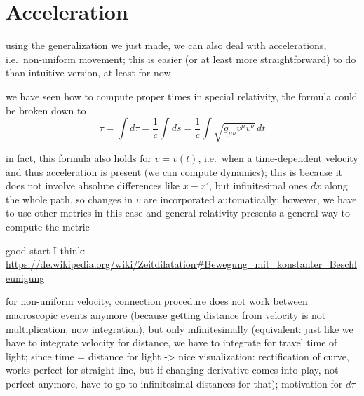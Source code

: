 \newpage



	\section{Acceleration}%
using the generalization we just made, we can also deal with accelerations, i.e.~non-uniform movement; this is easier (or at least more straightforward) to do than intuitive version, at least for now


we have seen how to compute proper times in special relativity, the formula could be broken down to 
\begin{equation}
\tau = \int d\tau = \frac{1}{c} \int ds = \frac{1}{c} \int \sqrt{g_{\mu \nu} v^\mu v^\nu} \, dt
\end{equation}

in fact, this formula also holds for $v = v(t)$, i.e.~when a time-dependent velocity and thus acceleration is present (we can compute dynamics); this is because it does not involve absolute differences like $x - x'$, but infinitesimal ones $dx$ along the whole path, so changes in $v$ are incorporated automatically; however, we have to use other metrics in this case and general relativity presents a general way to compute the metric



good start I think: \url{https://de.wikipedia.org/wiki/Zeitdilatation#Bewegung_mit_konstanter_Beschleunigung}




for non-uniform velocity, connection procedure does not work between macroscopic events anymore (because getting distance from velocity is not multiplication, now integration), but only infinitesimally (equivalent: just like we have to integrate velocity for distance, we have to integrate for travel time of light; since time = distance for light -> nice visualization: rectification of curve, works perfect for straight line, but if changing derivative comes into play, not perfect anymore, have to go to infinitesimal distances for that); motivation for $d\tau$





